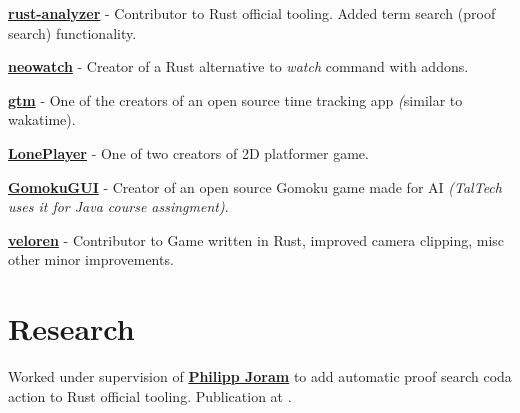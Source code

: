 \documentclass[]{deedy-resume-openfont}
\begin{document}
\begin{minipage}[t]{0.66\textwidth}
\begin{tightitemize}
  \item \textbf{\href{https://github.com/rust-lang/rust-analyzer}{rust-analyzer}} - Contributor to Rust official tooling. Added term search (proof search) functionality.
  \item \textbf{\href{https://github.com/kilpkonn/neowatch}{neowatch}} - Creator of a Rust alternative to \textit{watch} command with addons.
  \item \textbf{\href{https://github.com/DEVELOPEST}{gtm}} - One of the creators of an open source time tracking app \textit(similar to wakatime).
  \item \textbf{\href{https://github.com/kilpkonn/LonePlayer}{LonePlayer}} - One of two creators of 2D platformer game.
  \item \textbf{\href{https://github.com/kilpkonn/GomokuGUI}{GomokuGUI}} - Creator of an open source Gomoku game made for AI \textit{(TalTech uses it for Java course assingment)}.
  \item \textbf{\href{https://veloren.net/}{veloren}} - Contributor to Game written in Rust, improved camera clipping, misc other minor improvements.
\end{tightitemize}

\sectionspace %


\section{Research}


Worked under supervision of \textbf{\href{https://taltech.ee/en/contacts/philipp-joram}{Philipp Joram}} to add automatic proof search coda action to Rust official tooling. Publication at \cite{term-search-in-rust}.

\sectionspace %


%
%


\end{minipage}
\end{document}
